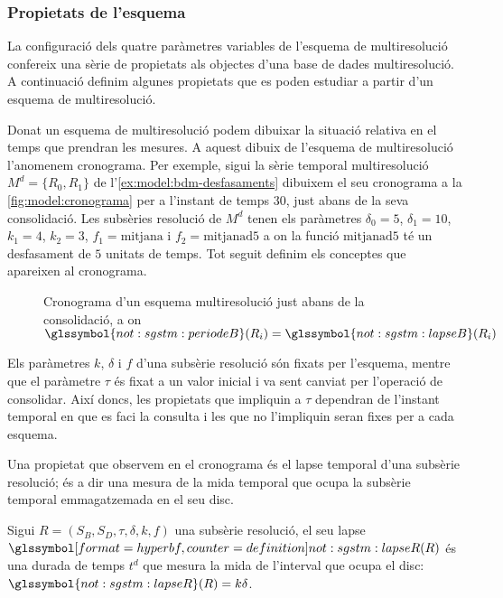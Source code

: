 \subsubsection{Propietats de l'esquema}

La configuració dels quatre paràmetres variables de l'esquema de
multiresolució confereix una sèrie de propietats als objectes d'una
base de dades multiresolució. A continuació definim algunes propietats
que es poden estudiar a partir d'un esquema de multiresolució.


Donat un esquema de multiresolució podem dibuixar la situació relativa
en el temps que prendran les mesures. A aquest dibuix de l'esquema de
multiresolució l'anomenem cronograma. Per exemple, sigui la sèrie
temporal multiresolució $M^d=\{R_0,R_1\}$ de
l'\autoref{ex:model:bdm-desfasaments} dibuixem el seu cronograma a la
\autoref{fig:model:cronograma} per a l'instant de temps $30$, just
abans de la seva consolidació. Les subsèries resolució de $M^d$ tenen
els paràmetres $\delta_0=5$, $\delta_1=10$, $k_1=4$, $k_2=3$,
$f_1=\text{mitjana}$ i $f_2=\text{mitjanad5}$ a on la funció
$\text{mitjanad5}$ té un desfasament de $5$ unitats de temps. Tot
seguit definim els conceptes que apareixen al cronograma.

\begin{figure}[tp]
  \centering
  
  \caption{Cronograma d'un esquema multiresolució just abans de la consolidació, a on $\glssymbol{not:sgstm:periodeB}(R_i)=\glssymbol{not:sgstm:lapseB}(R_i)$}
  \label{fig:model:cronograma}
\end{figure}


Els paràmetres $k$, $\delta$ i $f$ d'una subsèrie resolució són fixats
per l'esquema, mentre que el paràmetre $\tau$ és fixat a un valor
inicial i va sent canviat per l'operació de consolidar. Així doncs,
les propietats que impliquin a $\tau$ dependran de l'instant temporal
en que es faci la consulta i les que no l'impliquin seran fixes per a
cada esquema.

Una propietat que observem en el cronograma és el lapse temporal d'una
subsèrie resolució; és a dir una mesura de la mida temporal que ocupa
la subsèrie temporal emmagatzemada en el seu disc.
\begin{definition} %
  Sigui $R=(S_B,S_D,\tau,\delta,k,f)$ una subsèrie resolució, el seu
  lapse $\glssymboldef{not:sgstm:lapseR}(R)$ és una durada de temps $t^d$
  que mesura la mida de l'interval que ocupa el disc:
  $\glssymbol{not:sgstm:lapseR}(R) = k\delta$.
\end{definition}


